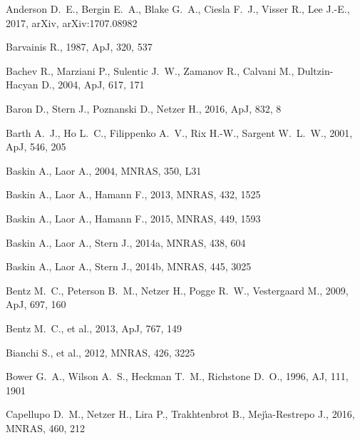 \documentclass[a4paper,fleqn,usenatbib]{mnras}
\begin{document}
	
\begin{thebibliography}{99}
 Anderson D.~E., Bergin E.~A., Blake G.~A., Ciesla F.~J., Visser R., Lee J.-E., 2017, arXiv, arXiv:1707.08982 

 Barvainis R., 1987, ApJ, 320, 537 

 Bachev R., Marziani P., Sulentic J.~W., Zamanov R., Calvani M., Dultzin-Hacyan D., 2004, ApJ, 617, 171 

 Baron D., Stern J., Poznanski D., Netzer H., 2016, ApJ, 832, 8 

 Barth A.~J., Ho L.~C., Filippenko A.~V., Rix H.-W., Sargent W.~L.~W., 2001, ApJ, 546, 205 

 Baskin A., Laor A., 2004, MNRAS, 350, L31 

 Baskin A., Laor A., Hamann F., 2013, MNRAS, 432, 1525 

 Baskin A., Laor A., Hamann F., 2015, MNRAS, 449, 1593 

 Baskin A., Laor A., Stern J., 2014a, MNRAS, 438, 604 

 Baskin A., Laor A., Stern J., 2014b, MNRAS, 445, 3025
 
 Bentz M.~C., Peterson B.~M., Netzer H., Pogge R.~W., Vestergaard M., 2009, ApJ, 697, 160 

 Bentz M.~C., et al., 2013, ApJ, 767, 149
 
 Bianchi S., et al., 2012, MNRAS, 426, 3225
 
 Bower G.~A., Wilson A.~S., Heckman T.~M., Richstone D.~O., 1996, AJ, 111, 1901 

 Capellupo D.~M., Netzer H., Lira P., Trakhtenbrot B., Mej{\'{\i}}a-Restrepo J., 2016, MNRAS, 460, 212 


\end{thebibliography}
\end{document}
